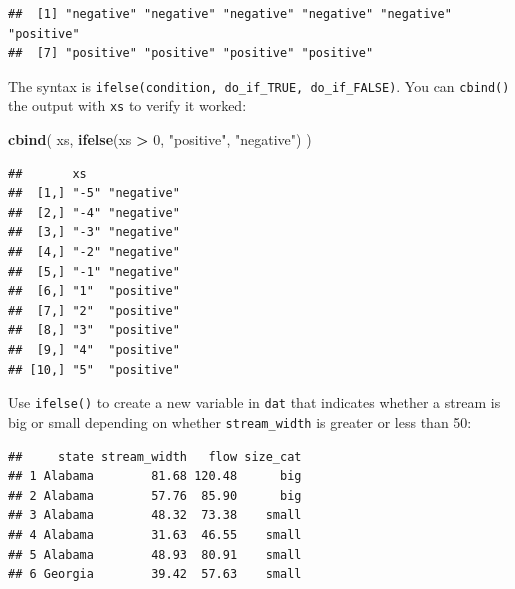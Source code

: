 \documentclass[]{book}
\newenvironment{Shaded}{\begin{snugshade}}{\end{snugshade}}
\newcommand{\KeywordTok}[1]{\textcolor[rgb]{0.13,0.29,0.53}{\textbf{#1}}}
\newcommand{\DecValTok}[1]{\textcolor[rgb]{0.00,0.00,0.81}{#1}}
\newcommand{\StringTok}[1]{\textcolor[rgb]{0.31,0.60,0.02}{#1}}
\newcommand{\OperatorTok}[1]{\textcolor[rgb]{0.81,0.36,0.00}{\textbf{#1}}}
\newcommand{\NormalTok}[1]{#1}
\theoremstyle{definition}
\theoremstyle{definition}
\theoremstyle{definition}
\theoremstyle{remark}
\begin{document}
\begin{verbatim}
##  [1] "negative" "negative" "negative" "negative" "negative" "positive"
##  [7] "positive" "positive" "positive" "positive"
\end{verbatim}

The syntax is \texttt{ifelse(condition,\ do\_if\_TRUE,\ do\_if\_FALSE)}.
You can \texttt{cbind()} the output with \texttt{xs} to verify it
worked:

\begin{Shaded}
\begin{Highlighting}[]
\KeywordTok{cbind}\NormalTok{(}
\NormalTok{  xs,}
  \KeywordTok{ifelse}\NormalTok{(xs }\OperatorTok{>}\StringTok{ }\DecValTok{0}\NormalTok{, }\StringTok{"positive"}\NormalTok{, }\StringTok{"negative"}\NormalTok{)}
\NormalTok{)}
\end{Highlighting}
\end{Shaded}

\begin{verbatim}
##       xs             
##  [1,] "-5" "negative"
##  [2,] "-4" "negative"
##  [3,] "-3" "negative"
##  [4,] "-2" "negative"
##  [5,] "-1" "negative"
##  [6,] "1"  "positive"
##  [7,] "2"  "positive"
##  [8,] "3"  "positive"
##  [9,] "4"  "positive"
## [10,] "5"  "positive"
\end{verbatim}

Use \texttt{ifelse()} to create a new variable in \texttt{dat} that
indicates whether a stream is big or small depending on whether
\texttt{stream\_width} is greater or less than 50:

\begin{Shaded}
\end{Shaded}

\begin{verbatim}
##     state stream_width   flow size_cat
## 1 Alabama        81.68 120.48      big
## 2 Alabama        57.76  85.90      big
## 3 Alabama        48.32  73.38    small
## 4 Alabama        31.63  46.55    small
## 5 Alabama        48.93  80.91    small
## 6 Georgia        39.42  57.63    small
\end{verbatim}
\end{document}
